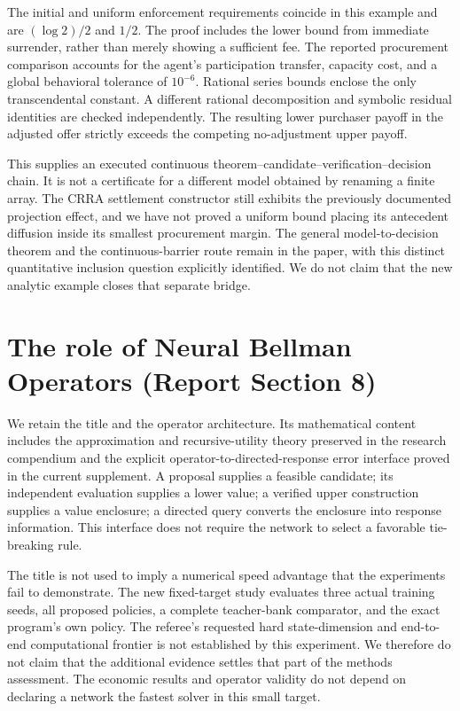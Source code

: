 The initial and uniform enforcement requirements coincide in this example and are $(\log2)/2$ and $1/2$. The proof includes the lower bound from immediate surrender, rather than merely showing a sufficient fee. The reported procurement comparison accounts for the agent's participation transfer, capacity cost, and a global behavioral tolerance of $10^{-6}$. Rational series bounds enclose the only transcendental constant. A different rational decomposition and symbolic residual identities are checked independently. The resulting lower purchaser payoff in the adjusted offer strictly exceeds the competing no-adjustment upper payoff.

This supplies an executed continuous theorem--candidate--verification--decision chain. It is not a certificate for a different model obtained by renaming a finite array. The CRRA settlement constructor still exhibits the previously documented projection effect, and we have not proved a uniform bound placing its antecedent diffusion inside its smallest procurement margin. The general model-to-decision theorem and the continuous-barrier route remain in the paper, with this distinct quantitative inclusion question explicitly identified. We do not claim that the new analytic example closes that separate bridge.

\section{The role of Neural Bellman Operators (Report Section 8)}
We retain the title and the operator architecture. Its mathematical content includes the approximation and recursive-utility theory preserved in the research compendium and the explicit operator-to-directed-response error interface proved in the current supplement. A proposal supplies a feasible candidate; its independent evaluation supplies a lower value; a verified upper construction supplies a value enclosure; a directed query converts the enclosure into response information. This interface does not require the network to select a favorable tie-breaking rule.

The title is not used to imply a numerical speed advantage that the experiments fail to demonstrate. The new fixed-target study evaluates three actual training seeds, all proposed policies, a complete teacher-bank comparator, and the exact program's own policy. The referee's requested hard state-dimension and end-to-end computational frontier is not established by this experiment. We therefore do not claim that the additional evidence settles that part of the methods assessment. The economic results and operator validity do not depend on declaring a network the fastest solver in this small target.

